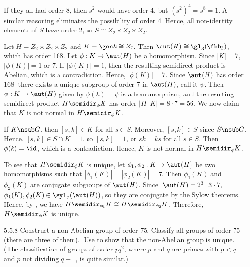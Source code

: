 \begin{solenum}[spsol]
    If they all had order 8, then $s^2$ would have order 4, but $(s^2)^4 = s^8 = 1$.
	A similar reasoning eliminates the possibility of order 4.
	Hence, all non-identity elements of $S$ have order 2, so $S \cong Z_2 \times Z_2 \times Z_2$.
    \item Let $H = Z_2 \times Z_2 \times Z_2$ and $K = \gen k \cong Z_7$.
	Then $\aut(H) \cong \gl_3(\fbb_2)$, which has order 168.
	Let $\phi : K \to \aut(H)$ be a homomorphism.
	Since $|K| = 7$, $|\phi(K)| = 1$ or 7.
	If $|\phi(K)| = 1$, then the resulting semidirect product is Abelian, which is a contradiction.
	Hence, $|\phi(K)| = 7$.
	Since $\aut(H)$ has order 168, there exists a unique subgroup of order 7 in $\aut(H)$, call it $\psi$.
	Then $\phi : K \to \aut(H)$ given by $\phi(k) = \psi$ is a homomorphism, and the resulting semidirect product $H \semidir_\phi K$ has order $|H||K| = 8 \cdot 7 = 56$.
	We now claim that $K$ is not normal in $H \semidir_\phi K$.
    
    If $K \nsub G$, then $[s, k] \in K$ for all $s \in S$.
	Moreover, $[s, k] \in S$ since $S \nsub G$.
	Hence, $[s, k] \in S \cap K = 1$, so $[s, k] = 1$, or $sk = ks$ for all $s \in S$.
	Then $\phi(k) = \id$, which is a contradiction.
	Hence, $K$ is not normal in $H \semidir_\phi K$.

    To see that $H \semidir_\phi K$ is unique, let $\phi_1, \phi_2 : K \to \aut(H)$ be two homomorphisms such that $|\phi_1(K)| = |\phi_2(K)| = 7$.
	Then $\phi_1(K)$ and $\phi_2(K)$ are conjugate subgroups of $\aut(H)$.
	Since $|\aut(H) = 2^3 \cdot 3 \cdot 7$, $\phi_1(K), \phi_2(K) \in \syl_7(\aut(H))$, so they are conjugate by the Sylow theorems.
	Hence, by , we have $H \semidir_{\phi_1} K \cong H \semidir_{\phi_2} K$.
	Therefore, $H \semidir_\phi K$ is unique.
\end{solenum}

\begin{exercise}{5.5.8}
    Construct a non-Abelian group of order 75.
	Classify all groups of order 75 (there are three of them). [Use  to show that the non-Abelian group is unique.] (The classification of groups of order $pq^2$, where $p$ and $q$ are primes with $p < q$ and $p$ not dividing $q - 1$, is quite similar.)
\end{exercise}

